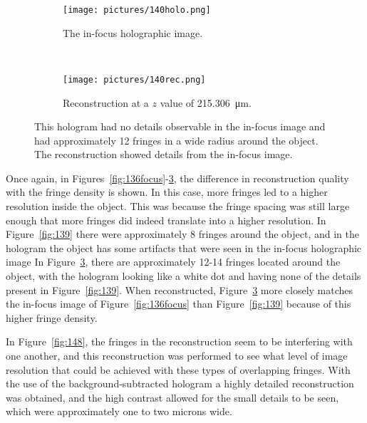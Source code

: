 \begin{figure}[ht!]
    \begin{center}

        \begin{subfigure}[t]{0.4\textwidth}
            \label{fig:140holo}
            \texttt{[image: pictures/140holo.png]}
            \caption{The in-focus holographic image.}
        \end{subfigure}
        \\
        \begin{subfigure}[t]{\textwidth}
            \label{fig:140rec}
            \texttt{[image: pictures/140rec.png]}
            \caption{Reconstruction at a $z$ value of
                \SI{215.306}{\micro\meter}.}
        \end{subfigure}


    \end{center}
    \caption{%
        This hologram had no details observable in the in-focus image and had
        approximately 12 fringes in a wide radius around the object. The
        reconstruction showed details from the in-focus image.
    }%
    \label{fig:140}
\end{figure}

Once again, in Figures~\ref{fig:136focus}-\ref{fig:140}, the difference in
reconstruction quality with the fringe density is shown. In this case, 
more fringes led to a higher
resolution inside the object. This was because the fringe spacing was still
large enough that more fringes did indeed translate into a higher resolution.
In Figure~\ref{fig:139} there were approximately
8 fringes around the object, and in the hologram the object has some
artifacts that were seen in the in-focus holographic image
In Figure~\ref{fig:140}, there are approximately
12-14 fringes located around the object, with the hologram looking like a white
dot and having none of the details present in Figure~\ref{fig:139}. When reconstructed,
Figure~\ref{fig:140} more closely matches the in-focus image of
Figure~\ref{fig:136focus} than Figure~\ref{fig:139} because of this higher
fringe density.

In Figure~\ref{fig:148}, the fringes in the reconstruction seem to be
interfering with one another, and this reconstruction was performed to see what
level of image resolution that could be achieved with these types of overlapping fringes.
With the use of the background-subtracted hologram a highly detailed
reconstruction was obtained, and the high contrast allowed for the small
details to be seen, which were
approximately one to two microns wide.

